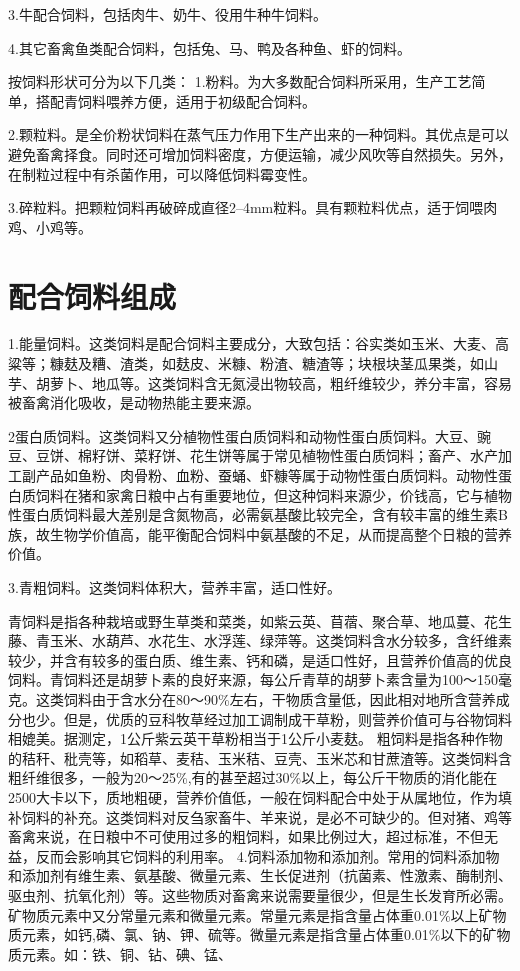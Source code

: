 \documentclass{ctexbook}
\begin{document}
3.牛配合饲料，包括肉牛、奶牛、役用牛种牛饲料。

4.其它畜禽鱼类配合饲料，包括兔、马、鸭及各种鱼、虾的饲料。

按饲料形状可分为以下几类：
1.粉料。为大多数配合饲料所采用，生产工艺简单，搭配青饲料喂养方便，适用于初级配合饲料。

2.颗粒料。是全价粉状饲料在蒸气压力作用下生产出来的一种饲料。其优点是可以避免畜禽择食。同时还可增加饲料密度，方便运输，减少风吹等自然损失。另外，在制粒过程中有杀菌作用，可以降低饲料霉变性。

3.碎粒料。把颗粒饲料再破碎成直径2--4mm粒料。具有颗粒料优点，适于饲喂肉鸡、小鸡等。
\section{配合饲料组成}
1.能量饲料。这类饲料是配合饲料主要成分，大致包括：谷实类如玉米、大麦、高粱等；糠麸及糟、渣类，如麸皮、米糠、粉渣、糖渣等；块根块茎瓜果类，如山芋、胡萝卜、地瓜等。这类饲料含无氮浸出物较高，粗纤维较少，养分丰富，容易被畜禽消化吸收，是动物热能主要来源。

2蛋白质饲料。这类饲料又分植物性蛋白质饲料和动物性蛋白质饲料。大豆、豌豆、豆饼、棉籽饼、菜籽饼、花生饼等属于常见植物性蛋白质饲料；畜产、水产加工副产品如鱼粉、肉骨粉、血粉、蚕蛹、虾糠等属于动物性蛋白质饲料。动物性蛋白质饲料在猪和家禽日粮中占有重要地位，但这种饲料来源少，价钱高，它与植物性蛋白质饲料最大差别是含氮物高，必需氨基酸比较完全，含有较丰富的维生素B族，故生物学价值高，能平衡配合饲料中氨基酸的不足，从而提高整个日粮的营养价值。

3.青粗饲料。这类饲料体积大，营养丰富，适口性好。

青饲料是指各种栽培或野生草类和菜类，如紫云英、苜蓿、聚合草、地瓜蔓、花生藤、青玉米、水葫芦、水花生、水浮莲、绿萍等。这类饲料含水分较多，含纤维素较少，并含有较多的蛋白质、维生素、钙和磷，是适口性好，且营养价值高的优良饲料。青饲料还是胡萝卜素的良好来源，每公斤青草的胡萝卜素含量为100〜150毫克。这类饲料由于含水分在80〜90\%左右，干物质含量低，因此相对地所含营养成分也少。但是，优质的豆科牧草经过加工调制成干草粉，则营养价值可与谷物饲料相媲美。据测定，1公斤紫云英干草粉相当于1公斤小麦麸。
粗饲料是指各种作物的秸秆、秕壳等，如稻草、麦秸、玉米秸、豆壳、玉米芯和甘蔗渣等。这类饲料含粗纤维很多，一般为20〜25\%,有的甚至超过30\%以上，每公斤干物质的消化能在2500大卡以下，质地粗硬，营养价值低，一般在饲料配合中处于从属地位，作为填补饲料的补充。这类饲料对反刍家畜牛、羊来说，是必不可缺少的。但对猪、鸡等畜禽来说，在日粮中不可使用过多的粗饲料，如果比例过大，超过标准，不但无益，反而会影响其它饲料的利用率。
4.饲料添加物和添加剂。常用的饲料添加物和添加剂有维生素、氨基酸、微量元素、生长促进剂（抗菌素、性激素、酶制剂、驱虫剂、抗氧化剂）等。这些物质对畜禽来说需要量很少，但是生长发育所必需。
矿物质元素中又分常量元素和微量元素。常量元素是指含量占体重0.01\%以上矿物质元素，如钙,磷、氯、钠、钾、硫等。微量元素是指含量占体重0.01\%以下的矿物质元素。如：铁、铜、钻、碘、锰、
\end{document}
